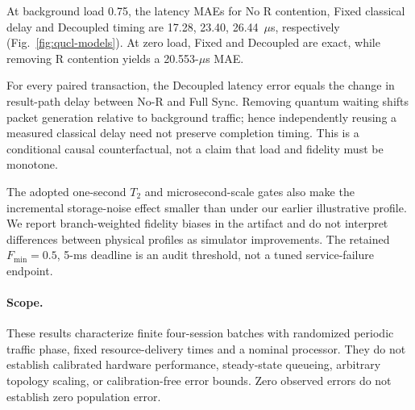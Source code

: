 At background load 0.75, the latency MAEs for No R contention, Fixed classical delay and Decoupled timing are 17.28, 23.40, 26.44~$\mu$s, respectively (Fig.~\ref{fig:qucl-models}). At zero load, Fixed and Decoupled are exact, while removing R contention yields a 20.553-$\mu$s MAE.

For every paired transaction, the Decoupled latency error equals the
change in result-path delay between No-R and Full Sync. Removing quantum
waiting shifts packet generation relative to background traffic; hence
independently reusing a measured classical delay need not preserve
completion timing. This is a conditional causal counterfactual, not a
claim that load and fidelity must be monotone.

The adopted one-second $T_2$ and microsecond-scale gates also make the
incremental storage-noise effect smaller than under our earlier
illustrative profile. We report branch-weighted fidelity biases in the
artifact and do not interpret differences between physical profiles as
simulator improvements. The retained $F_{\min}=0.5$, 5-ms deadline is an
audit threshold, not a tuned service-failure endpoint.

\paragraph{Scope.}
These results characterize finite four-session batches with randomized
periodic traffic phase, fixed resource-delivery times and a nominal
processor. They do not establish calibrated hardware performance,
steady-state queueing, arbitrary topology scaling, or calibration-free
error bounds. Zero observed errors do not establish zero population error.
